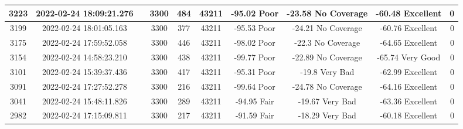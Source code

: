 \begin{longtable*}{|c|c|c|c|c|c|c|c|c|c|}
3223&2022-02-24 18:09:21.276&&3300&484&43211& -95.02    Poor        & -23.58    No Coverage & -60.48    Excellent   & 0\\\hline
{}3199&2022-02-24 18:01:05.163&&3300&377&43211& -95.53    Poor        & -24.21    No Coverage & -60.76    Excellent   & 0\\\hline
{}3175&2022-02-24 17:59:52.058&&3300&446&43211& -98.02    Poor        & -22.3     No Coverage & -64.65    Excellent   & 0\\\hline
{}3154&2022-02-24 14:58:23.210&&3300&438&43211& -99.77    Poor        & -22.89    No Coverage & -65.74    Very Good   & 0\\\hline
{}3101&2022-02-24 15:39:37.436&&3300&417&43211& -95.31    Poor        & -19.8     Very Bad    & -62.99    Excellent   & 0\\\hline
{}3091&2022-02-24 17:27:52.278&&3300&216&43211& -99.64    Poor        & -24.78    No Coverage & -64.16    Excellent   & 0\\\hline
{}3041&2022-02-24 15:48:11.826&&3300&289&43211& -94.95    Fair        & -19.67    Very Bad    & -63.36    Excellent   & 0\\\hline
{}2982&2022-02-24 17:15:09.811&&3300&217&43211& -91.59    Fair        & -18.29    Very Bad    & -60.18    Excellent   & 0\\\hline

\end{longtable*}
